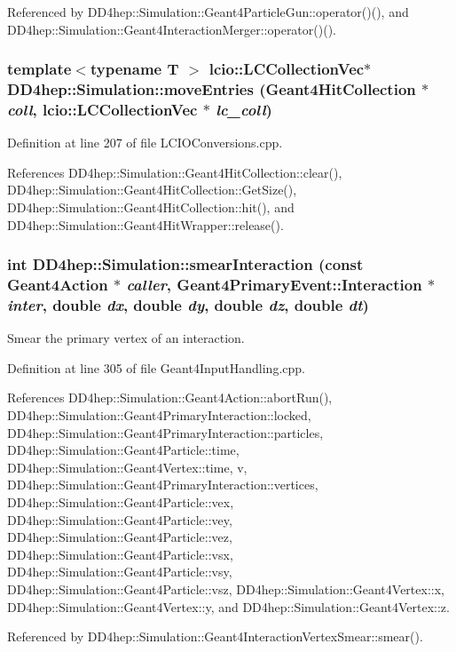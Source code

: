 Referenced by DD4hep::Simulation::Geant4ParticleGun::operator()(), and DD4hep::Simulation::Geant4InteractionMerger::operator()().\hypertarget{namespace_d_d4hep_1_1_simulation_a93ffa3fab19c389039276ed3576e8c55}{
\subsubsection[{moveEntries}]{\setlength{\rightskip}{0pt plus 5cm}template$<$typename T $>$ lcio::LCCollectionVec$\ast$ DD4hep::Simulation::moveEntries (Geant4HitCollection $\ast$ {\em coll}, \/  lcio::LCCollectionVec $\ast$ {\em lc\_\-coll})}}
\label{namespace_d_d4hep_1_1_simulation_a93ffa3fab19c389039276ed3576e8c55}


Definition at line 207 of file LCIOConversions.cpp.

References DD4hep::Simulation::Geant4HitCollection::clear(), DD4hep::Simulation::Geant4HitCollection::GetSize(), DD4hep::Simulation::Geant4HitCollection::hit(), and DD4hep::Simulation::Geant4HitWrapper::release().\hypertarget{namespace_d_d4hep_1_1_simulation_a139e5502767fe9672b4d32c1e276aec3}{
\subsubsection[{smearInteraction}]{\setlength{\rightskip}{0pt plus 5cm}int DD4hep::Simulation::smearInteraction (const {\bf Geant4Action} $\ast$ {\em caller}, \/  {\bf Geant4PrimaryEvent::Interaction} $\ast$ {\em inter}, \/  double {\em dx}, \/  double {\em dy}, \/  double {\em dz}, \/  double {\em dt})}}
\label{namespace_d_d4hep_1_1_simulation_a139e5502767fe9672b4d32c1e276aec3}


Smear the primary vertex of an interaction. 

Definition at line 305 of file Geant4InputHandling.cpp.

References DD4hep::Simulation::Geant4Action::abortRun(), DD4hep::Simulation::Geant4PrimaryInteraction::locked, DD4hep::Simulation::Geant4PrimaryInteraction::particles, DD4hep::Simulation::Geant4Particle::time, DD4hep::Simulation::Geant4Vertex::time, v, DD4hep::Simulation::Geant4PrimaryInteraction::vertices, DD4hep::Simulation::Geant4Particle::vex, DD4hep::Simulation::Geant4Particle::vey, DD4hep::Simulation::Geant4Particle::vez, DD4hep::Simulation::Geant4Particle::vsx, DD4hep::Simulation::Geant4Particle::vsy, DD4hep::Simulation::Geant4Particle::vsz, DD4hep::Simulation::Geant4Vertex::x, DD4hep::Simulation::Geant4Vertex::y, and DD4hep::Simulation::Geant4Vertex::z.

Referenced by DD4hep::Simulation::Geant4InteractionVertexSmear::smear().
